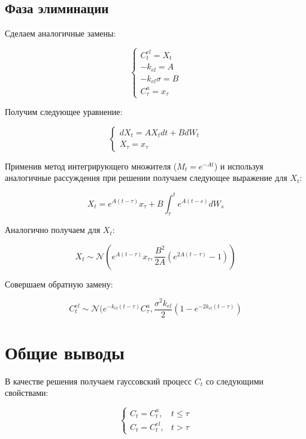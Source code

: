 \documentclass[12pt]{article}
\begin{document}
\subsection{Фаза элиминации}

Сделаем аналогичные замены:

\[
	\begin{cases}
		C_t^{el} = X_t     \\
		-k_{el} = A        \\
		-k_{el} \sigma = B \\
		C_{\tau}^a = x_{\tau}
	\end{cases}
\]

Получим следующее уравнение:

\[
	\begin{cases}
		dX_t = A X_t dt + B dW_t \\
		X_{\tau} = x_{\tau}
	\end{cases}
\]

Применив метод интегрирующего множителя ($M_t = e^{-At}$) и используя аналогичные рассуждения при решении получаем следующее выражение для $X_t$:

\[
	X_t = e^{A(t - \tau)} x_{\tau} + B \int_{\tau}^{t} e^{A(t - s)} dW_s
\]

Аналогично получаем для $X_t$:

\[
	X_t \sim \mathcal{N}(e^{A(t - \tau)} x_{\tau} , \frac{B^2}{2A}(e^{2A(t - \tau)} - 1))
\]

Совершаем обратную замену:

\[
	C_t^{el} \sim \mathcal{N}(e^{-k_{el}(t - \tau)} C_{\tau}^a , \frac{\sigma^2 k_{el}}{2}(1 - e^{-2k_{el}(t - \tau)})
\]

\section{Общие выводы}

В качестве решения получаем гауссовский процесс $C_t$ со следующими свойствами:

\[
	\begin{cases}
		C_t = C_t^a,    & t \le \tau \\
		C_t = C_t^{el}, & t > \tau
	\end{cases}
\]
\end{document}
